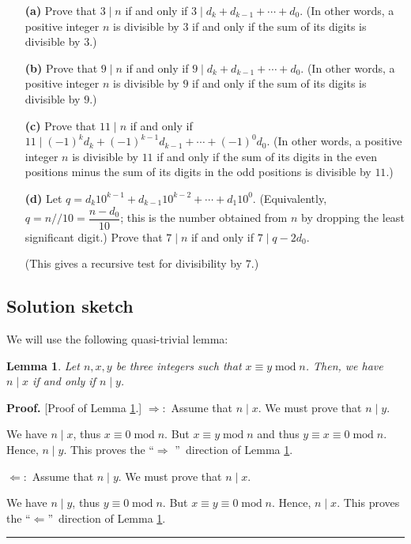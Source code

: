 \documentclass[paper=a4, fontsize=12pt]{scrartcl}%
\theoremstyle{plainsl}
\newtheorem{lemma}[theorem]{Lemma}
\theoremstyle{definition}
\theoremstyle{remark}
\newenvironment{proof}[1][Proof]{\noindent\textbf{#1.} }{\ \rule{0.5em}{0.5em}}
\begin{document}
\begin{enumerate}
\item[\textbf{(a)}] Prove that $3 \mid n$ if and only if $3 \mid d_{k} +
d_{k-1} + \cdots+ d_{0}$. (In other words, a positive integer $n$ is divisible
by $3$ if and only if the sum of its digits is divisible by $3$.)

\item[\textbf{(b)}] Prove that $9 \mid n$ if and only if $9 \mid d_{k} +
d_{k-1} + \cdots+ d_{0}$. (In other words, a positive integer $n$ is divisible
by $9$ if and only if the sum of its digits is divisible by $9$.)

\item[\textbf{(c)}] Prove that $11 \mid n$ if and only if $11 \mid\left(  -1
\right)  ^{k} d_{k} + \left(  -1 \right)  ^{k-1} d_{k-1} + \cdots+ \left(  -1
\right)  ^{0} d_{0}$. (In other words, a positive integer $n$ is divisible by
$11$ if and only if the sum of its digits in the even positions minus the sum
of its digits in the odd positions is divisible by $11$.)

\item[\textbf{(d)}] Let $q = d_{k} 10^{k-1} + d_{k-1} 10^{k-2} + \cdots+ d_{1}
10^{0}$. (Equivalently, $q = n // 10 = \dfrac{n-d_{0}}{10}$; this is the
number obtained from $n$ by dropping the least significant digit.) Prove that
$7 \mid n$ if and only if $7 \mid q - 2 d_{0}$.

(This gives a recursive test for divisibility by $7$.)
\end{enumerate}



\subsection{Solution sketch}

We will use the following quasi-trivial lemma:

\begin{lemma}
\label{lem.ent.mod.ndivx=ndivy}Let $n,x,y$ be three integers such that
$x\equiv y\operatorname{mod}n$. Then, we have $n\mid x$ if and only if $n\mid
y$.
\end{lemma}

\begin{proof}
[Proof of Lemma \ref{lem.ent.mod.ndivx=ndivy}.] $\Longrightarrow:$ Assume that
$n\mid x$. We must prove that $n\mid y$.

We have $n\mid x$, thus $x\equiv0\operatorname{mod}n$. But $x\equiv
y\operatorname{mod}n$ and thus $y\equiv x\equiv0\operatorname{mod}n$. Hence,
$n\mid y$. This proves the \textquotedblleft$\Longrightarrow$%
\textquotedblright\ direction of Lemma \ref{lem.ent.mod.ndivx=ndivy}.

$\Longleftarrow:$ Assume that $n\mid y$. We must prove that $n\mid x$.

We have $n\mid y$, thus $y\equiv0\operatorname{mod}n$. But $x\equiv
y\equiv0\operatorname{mod}n$. Hence, $n\mid x$. This proves the
\textquotedblleft$\Longleftarrow$\textquotedblright\ direction of Lemma
\ref{lem.ent.mod.ndivx=ndivy}.
\end{proof}
\end{document}
